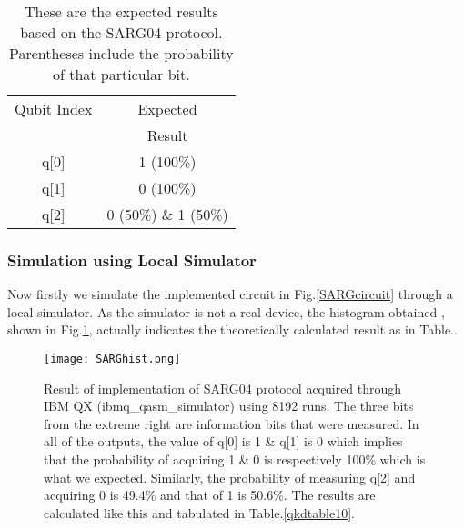 \documentclass[superscriptaddress,twocolumn,showpacs,prb,floatfix]{revtex4}
\begin{document}
\begin{table}[ht]
    \centering
    \begin{tabular}{|c|c|}
    \hline\hline
    Qubit Index & Expected\\ & Result  \\ [0.5ex]
    \hline
    q[0] & 1 (100\%)\\[0.5ex]
    \hline
    q[1] & 0 (100\%) \\[0.5ex]
    \hline
    q[2] & 0 (50\%) \& 1 (50\%) \\[0.5ex]
    \hline
    \end{tabular}
    \caption{These are the expected results based on the SARG04 protocol. Parentheses include the probability of that particular bit.}
    \label{qkdtable9}
\end{table}
\subsubsection{Simulation using Local Simulator}
\label{SecIIIAi}
Now firstly we simulate the implemented circuit in Fig.\ref{SARGcircuit} through a local simulator. As the simulator is not a real device, the histogram obtained , shown in Fig.\ref{SARGhist}, actually indicates the theoretically calculated result as in Table.\label{qkdtable9}. 
\begin{figure}[H]
    \centering
    \texttt{[image: SARGhist.png]}
    \caption{Result of implementation of SARG04 protocol acquired through IBM QX (ibmq\_qasm\_simulator) using 8192 runs. The three bits from the extreme right are information bits that were measured. In all of the outputs, the value of q[0] is 1 \& q[1] is 0 which implies that the probability of acquiring 1 \& 0 is respectively 100\% which is what we expected. Similarly, the probability of measuring q[2] and acquiring 0 is 49.4\% and that of 1 is 50.6\%. The results are calculated like this and tabulated in Table.\ref{qkdtable10}.}
    \label{SARGhist}
\end{figure}
\end{document}
